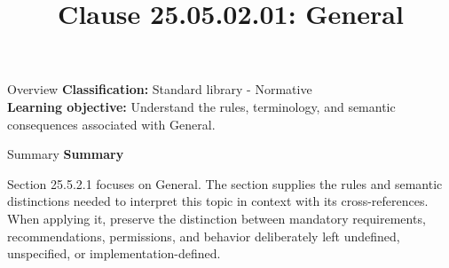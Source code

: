 \documentclass[10pt,letterpaper]{article}
\title{Clause 25.05.02.01: General}
\author{}
\date{}
\begin{document}
\maketitle
\begin{CornellOverviewBox}{Overview}
\textbf{Classification:} Standard library - Normative\\[2pt]
\textbf{Learning objective:} Understand the rules, terminology, and semantic consequences associated with General.
\end{CornellOverviewBox}\begin{CornellSummaryBox}{Summary}
{\sffamily\bfseries\color{Accent} Summary}\par\vspace{3pt}Section 25.5.2.1 focuses on General. The section supplies the rules and semantic distinctions needed to interpret this topic in context with its cross-references. When applying it, preserve the distinction between mandatory requirements, recommendations, permissions, and behavior deliberately left undefined, unspecified, or implementation-defined.
\end{CornellSummaryBox}
\end{document}
